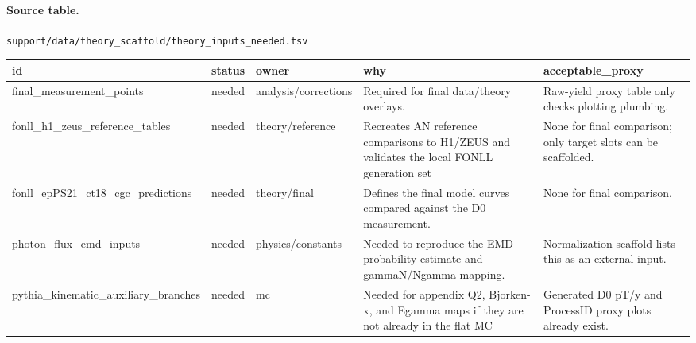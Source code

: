 \documentclass[11pt]{article}
\begin{document}
\paragraph{Source table.} \texttt{support/data/theory\_scaffold/theory\_inputs\_needed.tsv}
\begin{center}\scriptsize
\begin{tabular}{|l|l|l|l|l|}
\hline
id & status & owner & why & acceptable\_proxy \\ \hline
final\_measurement\_points & needed & analysis/corrections & Required for final data/theory overlays. & Raw-yield proxy table only checks plotting plumbing. \\ \hline
fonll\_h1\_zeus\_reference\_tables & needed & theory/reference & Recreates AN reference comparisons to H1/ZEUS and validates the local FONLL generation set & None for final comparison; only target slots can be scaffolded. \\ \hline
fonll\_epPS21\_ct18\_cgc\_predictions & needed & theory/final & Defines the final model curves compared against the D0 measurement. & None for final comparison. \\ \hline
photon\_flux\_emd\_inputs & needed & physics/constants & Needed to reproduce the EMD probability estimate and gammaN/Ngamma mapping. & Normalization scaffold lists this as an external input. \\ \hline
pythia\_kinematic\_auxiliary\_branches & needed & mc & Needed for appendix Q2, Bjorken-x, and Egamma maps if they are not already in the flat MC  & Generated D0 pT/y and ProcessID proxy plots already exist. \\ \hline
\end{tabular}
\end{center}
\end{document}
